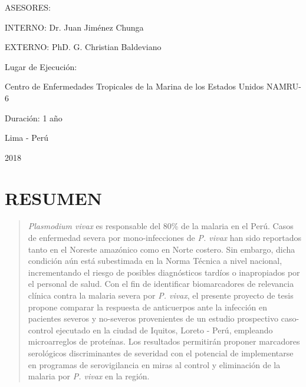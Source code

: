 \documentclass[a4paper]{article}
\begin{document}
\begin{centering}
ASESORES:

INTERNO: Dr. Juan Jiménez Chunga %

EXTERNO: PhD. G. Christian Baldeviano

\vspace{.3 cm}

Lugar de Ejecución:

Centro de Enfermedades Tropicales de la Marina de los Estados Unidos 
NAMRU-6

\vspace{.3 cm}

Duración: 1 año

\vspace{1.5 cm}

\Large
Lima - Perú


2018

\end{centering}

\vfill
\restoregeometry
\clearpage

\newpage

\tableofcontents

\newpage


\section*{RESUMEN}\label{resumen}

\begin{quote}
\emph{Plasmodium vivax} es responsable del 80\% de la malaria en el
Perú. Casos de enfermedad severa por mono-infecciones de \emph{P. vivax}
han sido reportados tanto en el Noreste amazónico como en Norte costero.
Sin embargo, dicha condición aún está subestimada en la Norma Técnica a
nivel nacional, incrementando el riesgo de posibles diagnósticos tardíos
o inapropiados por el personal de salud. Con el fin de identificar
biomarcadores de relevancia clínica contra la malaria severa por
\emph{P. vivax}, el presente proyecto de tesis propone comparar la
respuesta de anticuerpos ante la infección en pacientes severos y
no-severos provenientes de un estudio prospectivo caso-control ejecutado
en la ciudad de Iquitos, Loreto - Perú, empleando microarreglos de
proteínas. Los resultados permitirán proponer marcadores serológicos
discriminantes de severidad con el potencial de implementarse en
programas de serovigilancia en miras al control y eliminación de la
malaria por \emph{P. vivax} en la región.
\end{quote}
\end{document}
